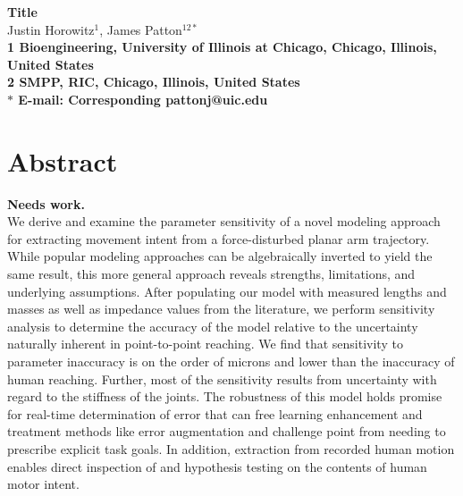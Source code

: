 \documentclass[10pt]{article}
\date{}
\begin{document}
\begin{flushleft}
{\Large
\textbf{Title}
}
\\
Justin Horowitz$^{1}$, 
James Patton$^{12\ast}$
\\
\bf{1} Bioengineering, University of Illinois at Chicago, Chicago, Illinois, United States
\\
\bf{2} SMPP, RIC, Chicago, Illinois, United States
\\
$\ast$ E-mail: Corresponding pattonj@uic.edu
\end{flushleft}

\section*{Abstract}
\textbf{Needs work.}\\
We derive and examine the parameter sensitivity of a novel modeling approach for extracting movement intent from a force-disturbed planar arm trajectory. While popular modeling approaches can be algebraically inverted to yield the same result, this more general approach reveals strengths, limitations, and underlying assumptions. After populating our model with measured lengths and masses as well as impedance values from the literature, we perform sensitivity analysis to determine the accuracy of the model relative to the uncertainty naturally inherent in point-to-point reaching. We find that sensitivity to parameter inaccuracy is on the order of microns and lower than the inaccuracy of human reaching. Further, most of the sensitivity results from uncertainty with regard to the stiffness of the joints. The robustness of this model holds promise for real-time determination of error that can free learning enhancement and treatment methods like error augmentation and challenge point from needing to prescribe explicit task goals. In addition, extraction from recorded human motion enables direct inspection of and hypothesis testing on the contents of human motor intent.
\end{document}
